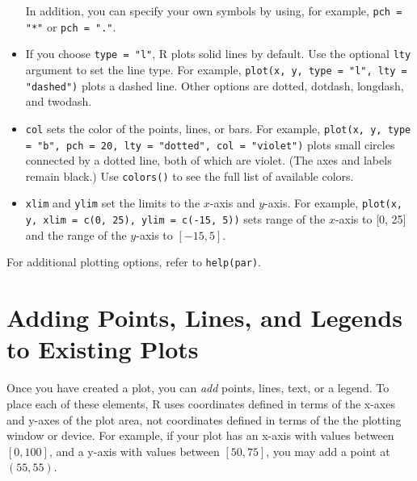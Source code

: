 \begin{itemize}
In addition, you can specify your own symbols by using, for example,
{\tt pch = "*"} or {\tt pch = "."}.  

\item If you choose {\tt type = "l"}, R plots solid lines by default.
  Use the optional {\tt lty} argument to set the line type.  For
  example, {\tt plot(x, y, type = "l", lty = "dashed")} plots a dashed
  line.  Other options are dotted, dotdash, longdash, and twodash.
  
\item \texttt{col} sets the color of the points, lines, or bars.  For
  example, \texttt{plot(x, y, type = "b", pch = 20, lty = "dotted",
    col = "violet")} plots small circles connected by a dotted line,
  both of which are violet.  (The axes and labels remain black.)  Use
  \texttt{colors()} to see the full list of available colors.
  
\item \texttt{xlim} and {\tt ylim} set the limits to the $x$-axis and
  $y$-axis.  For example, \texttt{plot(x, y, xlim = c(0, 25), ylim =
    c(-15, 5))} sets range of the $x$-axis to [0, 25] and the range of
  the $y$-axis to $[-15, 5]$.
\end{itemize}
For additional plotting options, refer to {\tt help(par)}.

\section{Adding Points, Lines, and Legends to Existing Plots}\label{ss:add}

Once you have created a plot, you can \emph{add} points, lines, text,
or a legend.  To place each of these elements, R uses coordinates
defined in terms of the x-axes and y-axes of the plot area, not
coordinates defined in terms of the the plotting window or device.
For example, if your plot has an x-axis with values between $[0,
100]$, and a y-axis with values between $[50, 75]$, you may add a
point at $(55,55)$.  

